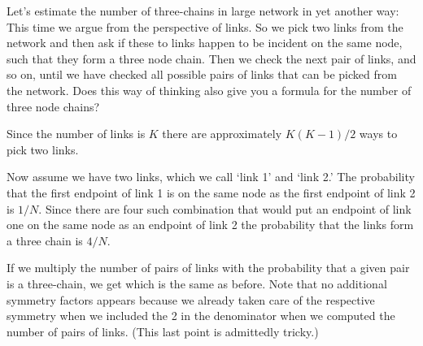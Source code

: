 Let's estimate the number of three-chains in large network in yet another way:
This time we argue from the perspective of links. So we pick two links from the network and then ask if these to links happen to be incident on the same node, such that they form a three node chain. Then we check the next pair of links, and so on, until we have checked all possible pairs of links that can be picked from the network. Does this way of thinking also give you a formula for the number of three node chains?   

\solution
Since the number of links is $K$ there are approximately $K(K-1)/2$ ways to pick two links. 

Now assume we have two links, which we call `link 1' and `link 2.' The probability that the first endpoint of link 1 is on the same node as the first endpoint of link 2 is $1/N$. Since there are four such combination that would put an endpoint of link one on the same node as an endpoint of link 2 the probability that the links form a three chain is $4/N$. 

If we multiply the number of pairs of links with the probability that a given pair is a three-chain, we get
which is the same as before. Note that no additional symmetry factors appears because we already taken care of the respective symmetry when we included the 2 in the denominator when we computed the number of pairs of links. (This last point is admittedly tricky.)